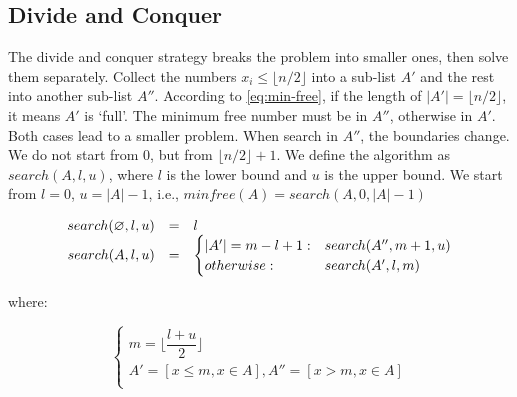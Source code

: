 \documentclass[b5paper]{article}
\begin{document}





\subsection*{Divide and Conquer}
The divide and conquer strategy breaks the problem into smaller ones, then solve them separately. Collect the numbers $x_i \leq \lfloor n/2 \rfloor$ into a sub-list $A'$ and the rest into another sub-list $A''$. According to \cref{eq:min-free}, if the length of $|A'| = \lfloor n/2 \rfloor$, it means $A'$ is `full'. The minimum free number must be in $A''$, otherwise in $A'$. Both cases lead to a smaller problem. When search in $A''$, the boundaries change. We do not start from $0$, but from $\lfloor n/2 \rfloor + 1$. We define the algorithm as $search(A, l, u)$, where $l$ is the lower bound and $u$ is the upper bound. We start from $l = 0$, $u = |A| - 1$, i.e., $minfree(A) = search(A, 0, |A|-1)$

\[
\begin{array}{rcl}
search(\varnothing, l, u) & = & l \\
search(A, l, u) & = & \begin{cases}
       |A'| = m - l + 1 : & search(A'', m+1, u) \\
       otherwise : & search(A',  l, m) \\
\end{cases}
\end{array}
\]

where:

\[
\begin{cases}
m = \lfloor \dfrac{l + u}{2} \rfloor \\
A' = [x \leq m, x \in A], A'' = [x > m, x \in A] \\
\end{cases}
\]
\end{document}
